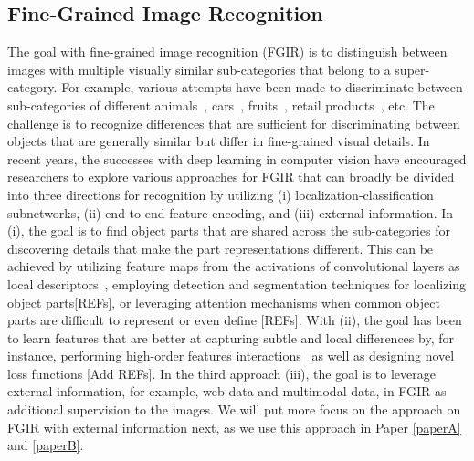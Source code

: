 \subsection{Fine-Grained Image Recognition}
The goal with fine-grained image recognition (FGIR) is to distinguish between images with multiple visually similar sub-categories that belong to a super-category. For example, various attempts have been made to discriminate between sub-categories of different animals~\cite{van2018inaturalist}, cars~\cite{krause2013stanford_cars}, fruits~\cite{hou2017vegfru}, retail products~\cite{wei2019rpc}, etc. The challenge is to recognize differences that are sufficient for discriminating between objects that are generally similar but differ in fine-grained visual details. In recent years, the successes with deep learning in computer vision have encouraged researchers to explore various approaches for FGIR that can broadly be divided into three directions for recognition by utilizing (i) localization-classification subnetworks, (ii) end-to-end feature encoding, and (iii) external information. In (i), the goal is to find object parts that are shared across the sub-categories for discovering details that make the part representations different. This can be achieved by utilizing feature maps from the activations of convolutional layers as local descriptors~\cite{zhang2016picking, wang2018learning, ding2019selective}, employing detection and segmentation techniques for localizing object parts[REFs], or leveraging attention mechanisms when common object parts are difficult to represent or even define [REFs]. With (ii), the goal has been to learn features that are better at capturing subtle and local differences by, for instance, performing high-order features interactions~\cite{lin2015bilinear} as well as designing novel loss functions [Add REFs]. In the third approach (iii), the goal is to leverage external information, for example, web data and multimodal data, in FGIR as additional supervision to the images. We will put more focus on the approach on FGIR with external information next, as we use this approach in Paper \ref{paperA} and \ref{paperB}. 

